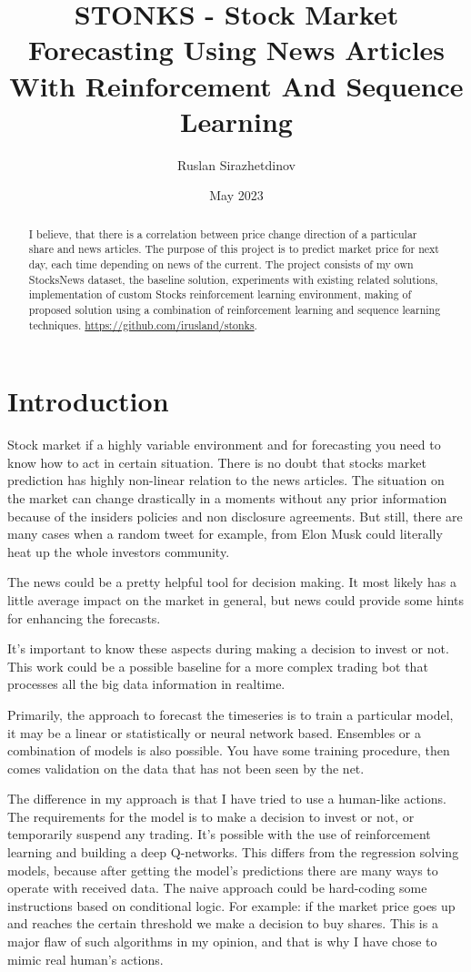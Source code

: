 \documentclass{article}
\title{STONKS - Stock Market Forecasting Using News Articles With Reinforcement And Sequence Learning}
\author{Ruslan Sirazhetdinov}
\date{May 2023}
\begin{document}
\maketitle
\begin{abstract}
    I believe, that there is a correlation between price change direction of a particular share and news articles. The purpose of this project is to predict market price for next day, each time depending on news of the current. The project consists of my own StocksNews dataset, the baseline solution, experiments with existing related solutions, implementation of custom Stocks reinforcement learning environment, making of proposed solution using a combination of reinforcement learning and sequence learning techniques.
    \url{https://github.com/irusland/stonks}.
\end{abstract}



\section{Introduction}
Stock market if a highly variable environment and for forecasting you need to know how to act in certain situation. 
There is no doubt that stocks market prediction has highly non-linear relation to the news articles. The situation on the market can change drastically in a moments without any prior information because of the insiders policies and non disclosure agreements. But still, there are many cases when a random tweet for example, from Elon Musk could literally heat up the whole investors community.

The news could be a pretty helpful tool for decision making. 
It most likely has a little average impact on the market in general, but news could provide some hints for enhancing the forecasts.

It's important to know these aspects during making a decision to invest or not. This work could be a possible baseline for a more complex trading bot that processes all the big data information in realtime.

Primarily, the approach to forecast the timeseries is to train a particular model, it may be a linear or statistically or neural network based. Ensembles or a combination of models is also possible. You have some training procedure, then comes validation on the data that has not been seen by the net.

The difference in my approach is that I have tried to use a human-like actions.
The requirements for the model is to make a decision to invest or not, or temporarily suspend any trading.
It's possible with the use of reinforcement learning and building a deep Q-networks.
This differs from the regression solving models, because after getting the model's predictions there are many ways to operate with received data. The naive approach could be hard-coding some instructions based on conditional logic. For example: if the market price goes up and reaches the certain threshold we make a decision to buy shares. 
This is a major flaw of such algorithms in my opinion, and that is why I have chose to mimic real human's actions.
\end{document}
